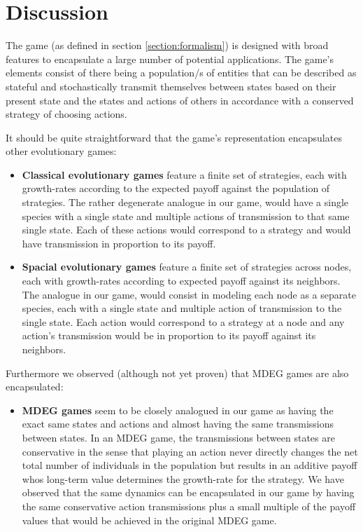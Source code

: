 \section{Discussion}\label{sec:discussion}

The game (as defined in section \ref{section:formalism}) is designed with broad features to encapsulate a large number of potential applications.
The game's elements consist of there being a population/s of entities that can be described as stateful and stochastically transmit themselves between states based on their present state and the states and actions of others in accordance with a conserved strategy of choosing actions.

It should be quite straightforward that the game's representation encapsulates other evolutionary games:
\newpage
\begin{itemize}[leftmargin=*,labelsep=4mm]
\item   \textbf{Classical evolutionary games} feature a finite set of strategies, each with growth-rates according to the expected payoff against the population of strategies. The rather degenerate analogue in our game, would have a single species with a single state and multiple actions of transmission to that same single state. Each of these actions would correspond to a strategy and would have transmission in proportion to its payoff.
\item   \textbf{Spacial evolutionary games} feature a finite set of strategies across nodes, each with growth-rates according to expected payoff against its neighbors.
The analogue in our game, would consist in modeling each node as a separate species, each with a single state and multiple action of transmission to the single state. Each action would correspond to a strategy at a node and any action's transmission would be in proportion to its payoff against its neighbors.
\end{itemize}
Furthermore we observed (although not yet proven) that MDEG games are also encapsulated: 
\begin{itemize}[leftmargin=*,labelsep=4mm]
\item   \textbf{MDEG games} seem to be closely analogued in our game as having the exact same states and actions and almost having the same transmissions between states.
In an MDEG game, the transmissions between states are conservative in the sense that playing an action never directly changes the net total number of individuals in the population but results in an additive payoff whos long-term value determines the growth-rate for the strategy.
We have observed that the same dynamics can be encapsulated in our game by having the same conservative action transmissions plus a small multiple of the payoff values that would be achieved in the original MDEG game.
\end{itemize}
